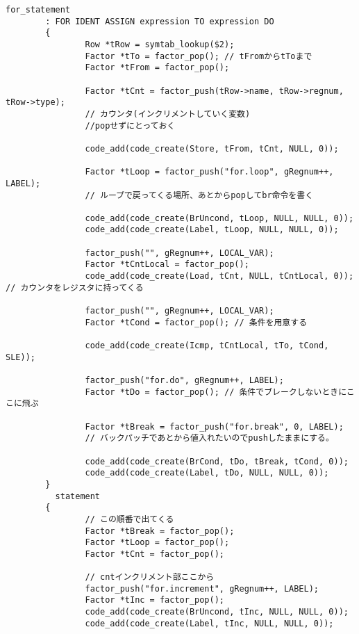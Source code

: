 \begin{lstlisting}[caption={for文の生成箇所},label={for文の生成箇所}]
for_statement
        : FOR IDENT ASSIGN expression TO expression DO
        {
                Row *tRow = symtab_lookup($2);
                Factor *tTo = factor_pop(); // tFromからtToまで
                Factor *tFrom = factor_pop();

                Factor *tCnt = factor_push(tRow->name, tRow->regnum, tRow->type);
                // カウンタ(インクリメントしていく変数)
                //popせずにとっておく

                code_add(code_create(Store, tFrom, tCnt, NULL, 0));

                Factor *tLoop = factor_push("for.loop", gRegnum++, LABEL);
                // ループで戻ってくる場所、あとからpopしてbr命令を書く

                code_add(code_create(BrUncond, tLoop, NULL, NULL, 0));
                code_add(code_create(Label, tLoop, NULL, NULL, 0));

                factor_push("", gRegnum++, LOCAL_VAR);
                Factor *tCntLocal = factor_pop();
                code_add(code_create(Load, tCnt, NULL, tCntLocal, 0)); // カウンタをレジスタに持ってくる

                factor_push("", gRegnum++, LOCAL_VAR);
                Factor *tCond = factor_pop(); // 条件を用意する

                code_add(code_create(Icmp, tCntLocal, tTo, tCond, SLE));

                factor_push("for.do", gRegnum++, LABEL);
                Factor *tDo = factor_pop(); // 条件でブレークしないときにここに飛ぶ

                Factor *tBreak = factor_push("for.break", 0, LABEL);
                // バックパッチであとから値入れたいのでpushしたままにする。

                code_add(code_create(BrCond, tDo, tBreak, tCond, 0));
                code_add(code_create(Label, tDo, NULL, NULL, 0));
        }
          statement
        {
                // この順番で出てくる
                Factor *tBreak = factor_pop();
                Factor *tLoop = factor_pop();
                Factor *tCnt = factor_pop();

                // cntインクリメント部ここから
                factor_push("for.increment", gRegnum++, LABEL);
                Factor *tInc = factor_pop();
                code_add(code_create(BrUncond, tInc, NULL, NULL, 0));
                code_add(code_create(Label, tInc, NULL, NULL, 0));


\end{lstlisting}
